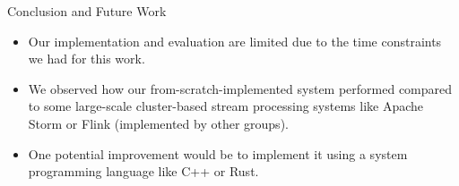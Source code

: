 \documentclass[9pt]{beamer}
\begin{document}
\begin{frame}[fragile]{Conclusion and Future Work}
    \begin{itemize}
        \item Our implementation and evaluation are limited due to the time constraints we had for this work.
        
        \item We observed how our from-scratch-implemented system performed compared to some large-scale cluster-based stream processing systems like Apache Storm or Flink (implemented by other groups).
        
        \item One potential improvement would be to implement it using a system programming language like C++ or Rust.
        
    \end{itemize}

    
    

\end{frame}





    

\end{document}
